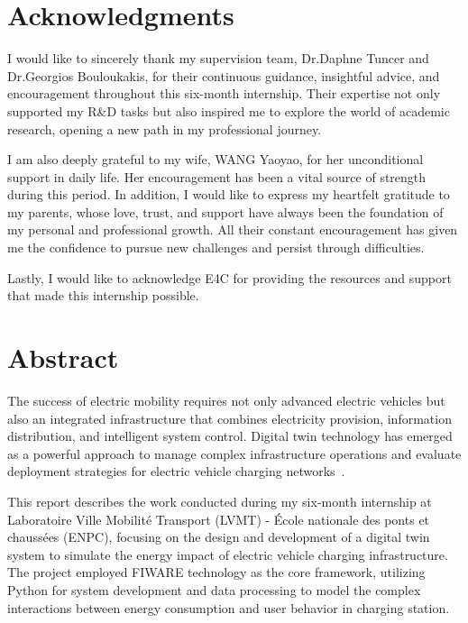 \documentclass[11pt]{memoir}
\begin{document}
\setcounter{secnumdepth}{3}
\thispagestyle{empty}




\chapter*{Acknowledgments}

I would like to sincerely thank my supervision team, Dr.Daphne Tuncer and Dr.Georgios Bouloukakis, for their continuous guidance, insightful advice, and encouragement throughout this six-month internship. Their expertise not only supported my R\&D tasks but also inspired me to explore the world of academic research, opening a new path in my professional journey.

I am also deeply grateful to my wife, WANG Yaoyao, for her unconditional support in daily life. Her encouragement has been a vital source of strength during this period. In addition, I would like to express my heartfelt gratitude to my parents, whose love, trust, and support have always been the foundation of my personal and professional growth. All their constant encouragement has given me the confidence to pursue new challenges and persist through difficulties.

Lastly, I would like to acknowledge E4C for providing the resources and support that made this internship possible.



\newpage



\chapter*{Abstract}

The success of electric mobility requires not only advanced electric vehicles but also an integrated infrastructure that combines electricity provision, information distribution, and intelligent system control. Digital twin technology has emerged as a powerful approach to manage complex infrastructure operations and evaluate deployment strategies for electric vehicle charging networks~\cite{Yu2024}.

This report describes the work conducted during my six-month internship at Laboratoire Ville Mobilité Transport (LVMT) - École nationale des ponts et chaussées (ENPC), focusing on the design and development of a digital twin system to simulate the energy impact of electric vehicle charging infrastructure. The project employed FIWARE technology as the core framework, utilizing Python for system development and data processing to model the complex interactions between energy consumption and user behavior in charging station.
\end{document}
